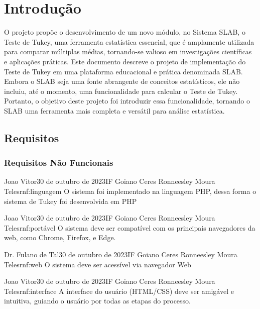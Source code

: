 \chapter{Introdução}
\label{capitulo:introducao}

O projeto propõe o desenvolvimento de um novo módulo, no Sistema SLAB, o Teste de Tukey, uma ferramenta estatística essencial, que é amplamente utilizada para comparar múltiplas médias, tornando-se valioso em investigações científicas e aplicações práticas. Este documento descreve o projeto de implementação do Teste de Tukey em uma plataforma educacional e prática denominada SLAB. Embora o SLAB seja uma fonte abrangente de conceitos estatísticos, ele não incluiu, até o momento, uma funcionalidade para calcular o Teste de Tukey. Portanto, o objetivo deste projeto foi introduzir essa funcionalidade, tornando o SLAB uma ferramenta mais completa e versátil para análise estatística.

\section{Requisitos}


\subsection{Requisitos Não Funcionais}

{Joao Vitor}{30 de outubro de 2023}{IF Goiano Ceres}
{Ronneesley Moura Teles}{rnf:linguagem}
{O sistema foi implementado na linguagem PHP, dessa forma o sistema de Tukey foi desenvolvida em PHP}

{Joao Vitor}{30 de outubro de 2023}{IF Goiano Ceres}
{Ronneesley Moura Teles}{rnf:portável}
{O sistema deve ser compatível com os principais navegadores da web, como Chrome, Firefox, e Edge.}

{Dr. Fulano de Tal}{30 de outubro de 2023}{IF Goiano Ceres}
{Ronneesley Moura Teles}{rnf:web}
{O sistema deve ser acessível via navegador Web}

{Joao Vitor}{30 de outubro de 2023}{IF Goiano Ceres}
{Ronneesley Moura Teles}{rnf:interface}
{A interface do usuário (HTML/CSS) deve ser amigável e intuitiva, guiando o usuário por todas as etapas do processo.}

